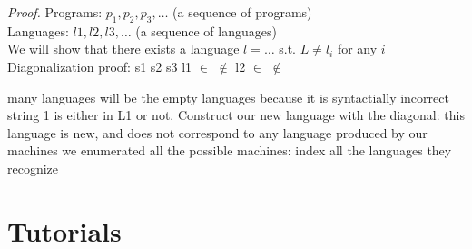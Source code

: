 \documentclass[11pt]{article}
\newcommand{\pf}{\textit{Proof. }}
\begin{document}
\pf{} 
Programs: $p_1, p_2, p_3, \dots$ (a sequence of programs) \\
Languages: $l1, l2, l3, \dots$ (a sequence of languages) \\
We will show that there exists a language $l = \dots $ s.t. $L \neq l_i$ for any $i$
Diagonalization proof:
   s1      s2     s3
l1 $\in$  $\notin$
l2       $\in$ 
                $\notin$
      
many languages will be the empty languages because it is syntactially incorrect
string 1 is either in L1 or not. 
Construct our new language with the diagonal: this language is new, and does not correspond to any language produced by our machines 
we enumerated all the possible machines: index all the languages they recognize

\section{Tutorials}
\end{document}
